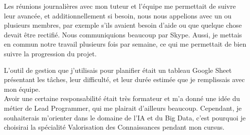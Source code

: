 Les réunions journalières avec mon tuteur et l'équipe me permettait de suivre leur avancée, et additionnellement si besoin, nous nous appelions avec un ou plusieurs membres, par exemple s'ils avaient besoin d'aide ou que quelque chose devait être rectifié.
Nous communiquions beaucoup par Skype.
Aussi, je mettais en commun notre travail plusieurs fois par semaine, ce qui me permettait de bien suivre la progression du projet.

L'outil de gestion que j'utilisais pour planifier était un tableau Google Sheet présentant les tâches, leur difficulté, et leur durée estimée que je remplissais avec mon équipe.\\

Avoir une certaine responsabilité était très formateur et m'a donné une idée du métier de Lead Programmer, qui me plairait d'ailleurs beaucoup.
Cependant, je souhaiterais m'orienter dans le domaine de l'IA et du Big Data, c'est pourquoi je choisirai la spécialité Valorisation des Connaissances pendant mon cursus.